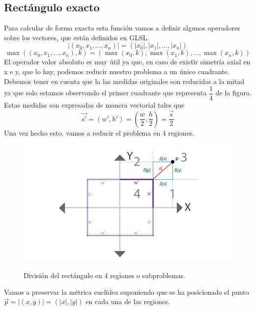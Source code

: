 \subsection{Rectángulo exacto}
Para calcular de forma exacta esta función vamos a definir algunos operadores sobre los vectores, que están definidos en GLSL.
\[\vert(x_0,x_1,\dots,x_n)\vert=(\vert x_0\vert,\vert x_1\vert,\dots,\vert x_n \vert)\]
\[\max\left((x_0,x_1,\dots,x_n), k\right)=(\max( x_0, k), \max(x_1, k),\dots, \max(x_n, k))\]
El operador valor absoluto es muy útil ya que, en caso de existir simetría axial en x e y, que lo hay, podemos reducir nuestro problema a un único cuadrante. Debemos tener en cuenta que la las medidas originales son reducidas a la mitad ya que solo estamos observando el primer cuadrante que representa \(\dfrac{1}{4}\) de la figura. Estas medidas son expresadas de manera vectorial tales que \[\Vec{s'}=(w', h')=\left(\dfrac{w}{2},\dfrac{h}{2}\right)=\dfrac{\Vec{s}}{2}\]
Una vez hecho esto, vamos a reducir el problema en 4 regiones.
\begin{figure}[H]
  \centering
  \captionsetup{justification=centering}%
  \includegraphics[width=1.0\textwidth]{secciones/imagenes/sdf/proofs/proof_rectangle.png}\label{fig:subproblem}
  \caption{División del rectángulo en 4 regiones o subproblemas.}
\end{figure}
Vamos a preservar la métrica euclídea suponiendo que se ha posicionado el punto \(\Vec{p}=\vert(x,y)\vert=(\vert x\vert, \vert y \vert)\) en cada una de las regiones.
